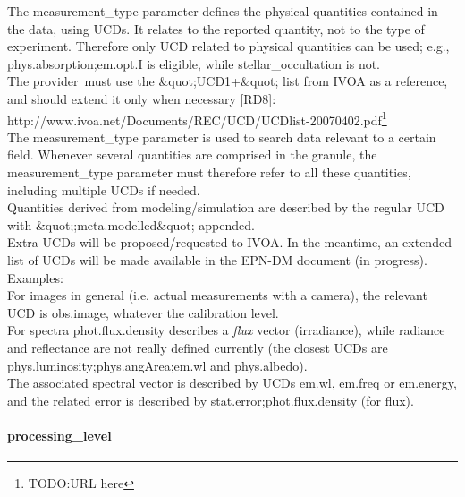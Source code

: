 \documentclass[11pt,a4paper]{ivoa}
\begin{document}
The measurement\_type parameter defines the physical quantities contained in the data, using UCDs. It relates to the reported quantity, not to the type of experiment. Therefore only UCD related to physical quantities can be used; e.g., phys.absorption;em.opt.I is eligible, while stellar\_occultation is not. \\ The provider must use the \&quot;UCD1+\&quot; list from IVOA as a reference, and should extend it only when necessary [RD8]:\\ http://www.ivoa.net/Documents/REC/UCD/UCDlist-20070402.pdf\footnote{TODO:URL here} \\ The measurement\_type parameter is used to search data relevant to a certain field. Whenever several quantities are comprised in the granule, the measurement\_type parameter must therefore refer to all these quantities, including multiple UCDs if needed.\\Quantities derived from modeling/simulation are described by the regular UCD with \&quot;;meta.modelled\&quot; appended.\\ Extra UCDs will be proposed/requested to IVOA. In the meantime, an extended list of UCDs will be made available in the EPN-DM document (in progress). \\ Examples:\\ For images in general (i.e. actual measurements with a camera), the relevant UCD is obs.image, whatever the calibration level.\\ For spectra phot.flux.density describes a \emph{flux} vector (irradiance), while radiance and reflectance are not really defined currently (the closest UCDs are phys.luminosity;phys.angArea;em.wl and phys.albedo).\\The associated spectral vector is described by UCDs em.wl, em.freq or em.energy, and the related error is described by stat.error;phot.flux.density (for flux).

\paragraph{processing\_level}
\end{document}
